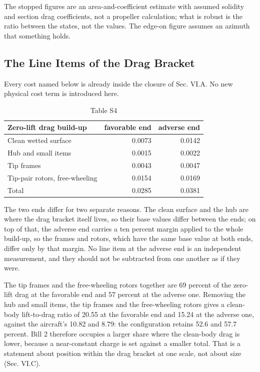 \documentclass[journal]{new-aiaa}
\begin{document}
The stopped figures are an area-and-coefficient estimate with assumed solidity and section drag coefficients, not a propeller calculation; what is robust is the ratio between the states, not the values. The edge-on figure assumes an azimuth that something holds.

\subsection*{The Line Items of the Drag Bracket}

Every cost named below is already inside the closure of Sec. VI.A. No new physical cost term is introduced here.

\begin{table}[htbp]
\centering
\caption*{Table S4}
\small
\begin{tabularx}{\linewidth}{Xrr}
\hline
Zero-lift drag build-up & favorable end & adverse end \\ \hline
Clean wetted surface & 0.0073 & 0.0142 \\
Hub and small items & 0.0015 & 0.0022 \\
Tip frames & 0.0043 & 0.0047 \\
Tip-pair rotors, free-wheeling & 0.0154 & 0.0169 \\
Total & 0.0285 & 0.0381 \\
\hline
\end{tabularx}
\end{table}

The two ends differ for two separate reasons. The clean surface and the hub are where the drag bracket itself lives, so their base values differ between the ends; on top of that, the adverse end carries a ten percent margin applied to the whole build-up, so the frames and rotors, which have the same base value at both ends, differ only by that margin. No line item at the adverse end is an independent measurement, and they should not be subtracted from one another as if they were.

The tip frames and the free-wheeling rotors together are 69 percent of the zero-lift drag at the favorable end and 57 percent at the adverse one. Removing the hub and small items, the tip frames and the free-wheeling rotors gives a clean-body lift-to-drag ratio of 20.55 at the favorable end and 15.24 at the adverse one, against the aircraft's 10.82 and 8.79: the configuration retains 52.6 and 57.7 percent. Bill 2 therefore occupies a larger share where the clean-body drag is lower, because a near-constant charge is set against a smaller total. That is a statement about position within the drag bracket at one scale, not about size (Sec. VI.C).
\end{document}
